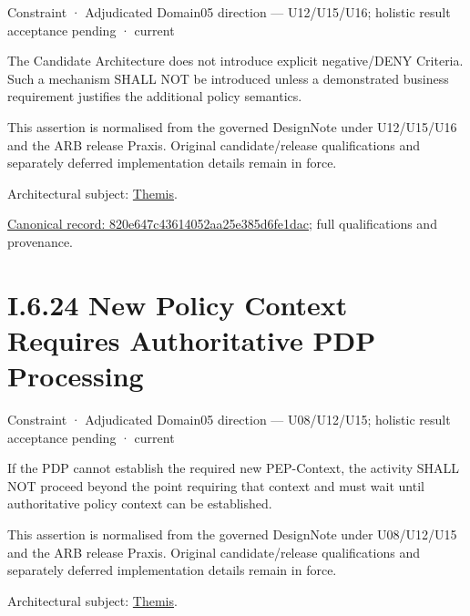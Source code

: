 \label{element:820e647c43614052aa25e385d6fe1dac}
{\small Constraint · Adjudicated Domain05 direction — U12/U15/U16; holistic result acceptance pending · current}\par

The Candidate Architecture does not introduce explicit negative/DENY Criteria. Such a mechanism SHALL NOT be introduced unless a demonstrated business requirement justifies the additional policy semantics.



This assertion is normalised from the governed DesignNote under U12/U15/U16 and the ARB release Praxis. Original candidate/release qualifications and separately deferred implementation details remain in force.



Architectural subject: \hyperref[element:899d34ec491948b68aad09e507dea6d1]{Themis}.


{\footnotesize \href{../../../../continuum/motivation/constraint/820e647c43614052aa25e385d6fe1dac.md}{Canonical record: 820e647c43614052aa25e385d6fe1dac}; full qualifications and provenance.}\par
\section*{I.6.24 New Policy Context Requires Authoritative PDP Processing}
\label{navigation:I.6.24}

\label{element:80629d4c229e4b7095d011bf77d704aa}
{\small Constraint · Adjudicated Domain05 direction — U08/U12/U15; holistic result acceptance pending · current}\par

If the PDP cannot establish the required new PEP-Context, the activity SHALL NOT proceed beyond the point requiring that context and must wait until authoritative policy context can be established.



This assertion is normalised from the governed DesignNote under U08/U12/U15 and the ARB release Praxis. Original candidate/release qualifications and separately deferred implementation details remain in force.



Architectural subject: \hyperref[element:899d34ec491948b68aad09e507dea6d1]{Themis}.


